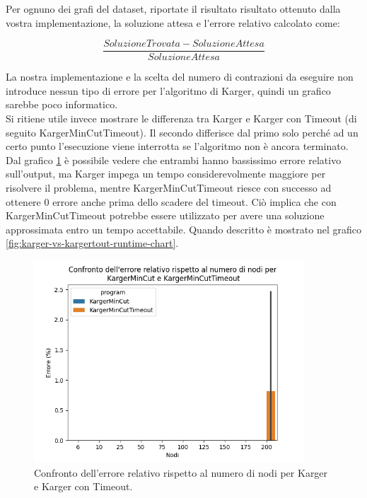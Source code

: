 \begin{displayquote}
Per ognuno dei grafi del dataset, riportate il risultato risultato
ottenuto dalla vostra implementazione, la soluzione attesa e l'errore
relativo calcolato come:

\begin{equation*}
    \frac{SoluzioneTrovata - SoluzioneAttesa}{SoluzioneAttesa}
\end{equation*}

\end{displayquote}

\noindent La nostra implementazione e la scelta del numero di
contrazioni da eseguire non introduce nessun tipo di errore per
l'algoritmo di Karger, quindi un grafico sarebbe poco informatico.\\

\noindent Si ritiene utile invece mostrare le differenza tra
Karger e Karger con Timeout (di seguito KargerMinCutTimeout). Il secondo
differisce dal primo solo perché ad un certo punto l'esecuzione viene
interrotta se l'algoritmo non è ancora terminato.\\

\noindent Dal grafico \ref{fig:karger-vs-kargertout-error-chart} è
possibile vedere che entrambi hanno bassissimo errore relativo
sull'output, ma Karger impega un tempo considerevolmente maggiore per
risolvere il problema, mentre KargerMinCutTimeout riesce con successo ad
ottenere $0$ errore anche prima dello scadere del timeout. Ciò implica
che con KargerMinCutTimeout potrebbe essere utilizzato per avere una
soluzione approssimata entro un tempo accettabile. Quando descritto è
mostrato nel grafico \ref{fig:karger-vs-kargertout-runtime-chart}.

\begin{figure}[H]
    \centering

    \includegraphics[width=0.9\textwidth]{./images/Confronto_dell'errore_relativo_rispetto_al_numero_di_nodi_per__KargerMinCut_e_KargerMinCutTimeout.png}

    \caption{Confronto dell'errore relativo rispetto al numero di nodi per Karger e Karger con Timeout.}
    \label{fig:karger-vs-kargertout-error-chart}
\end{figure}

